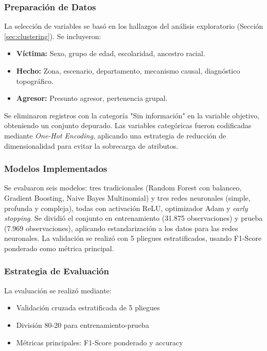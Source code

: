\documentclass[lettersize,journal]{IEEEtran}
\begin{document}
\subsubsection{Preparación de Datos}
La selección de variables se basó en los hallazgos del análisis exploratorio (Sección \ref{sec:clustering}). Se incluyeron:
\begin{itemize}
\item \textbf{Víctima:} Sexo, grupo de edad, escolaridad, ancestro racial.
\item \textbf{Hecho:} Zona, escenario, departamento, mecanismo causal, diagnóstico topográfico.
\item \textbf{Agresor:} Presunto agresor, pertenencia grupal.
\end{itemize}

Se eliminaron registros con la categoría "Sin información" en la variable objetivo, obteniendo un conjunto depurado. Las variables categóricas fueron codificadas mediante \textit{One-Hot Encoding}, aplicando una estrategia de reducción de dimensionalidad para evitar la sobrecarga de atributos.

\subsubsection{Modelos Implementados}
Se evaluaron seis modelos: tres tradicionales (Random Forest con balanceo, Gradient Boosting, Naive Bayes Multinomial) y tres redes neuronales (simple, profunda y compleja), todas con activación ReLU, optimizador Adam y \textit{early stopping}. Se dividió el conjunto en entrenamiento (31.875 observaciones) y prueba (7.969 observaciones), aplicando estandarización a los datos para las redes neuronales. La validación se realizó con 5 pliegues estratificados, usando F1-Score ponderado como métrica principal.


\subsubsection{Estrategia de Evaluación}
La evaluación se realizó mediante:

\begin{itemize}
\item Validación cruzada estratificada de 5 pliegues
\item División 80-20 para entrenamiento-prueba
\item Métricas principales: F1-Score ponderado y accuracy

\end{itemize}
\end{document}
